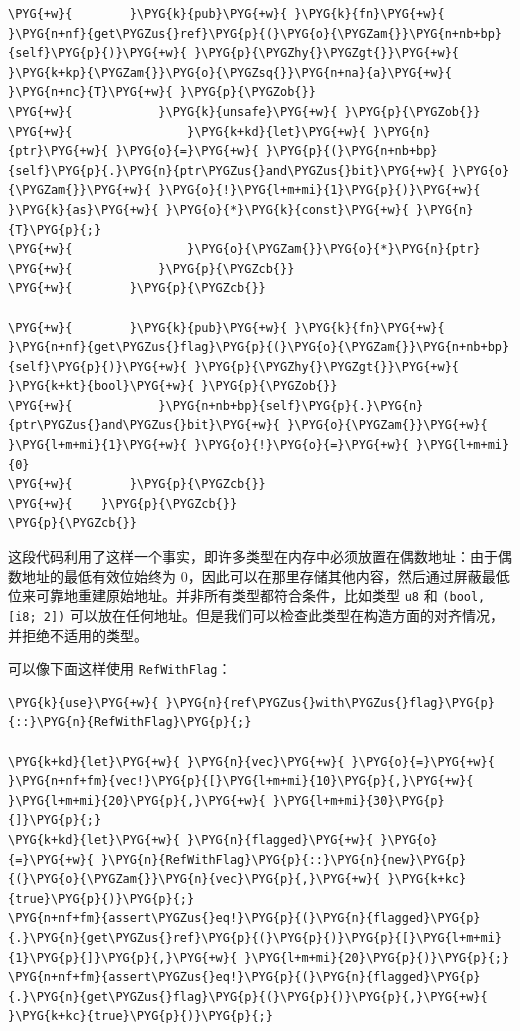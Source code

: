 \begin{Verbatim}[commandchars=\\\{\},breaklines=true,breakanywhere=true,fontsize=\codefont,xleftmargin=17bp]
\PYG{+w}{        }\PYG{k}{pub}\PYG{+w}{ }\PYG{k}{fn}\PYG{+w}{ }\PYG{n+nf}{get\PYGZus{}ref}\PYG{p}{(}\PYG{o}{\PYGZam{}}\PYG{n+nb+bp}{self}\PYG{p}{)}\PYG{+w}{ }\PYG{p}{\PYGZhy{}\PYGZgt{}}\PYG{+w}{ }\PYG{k+kp}{\PYGZam{}}\PYG{o}{\PYGZsq{}}\PYG{n+na}{a}\PYG{+w}{ }\PYG{n+nc}{T}\PYG{+w}{ }\PYG{p}{\PYGZob{}}
\PYG{+w}{            }\PYG{k}{unsafe}\PYG{+w}{ }\PYG{p}{\PYGZob{}}
\PYG{+w}{                }\PYG{k+kd}{let}\PYG{+w}{ }\PYG{n}{ptr}\PYG{+w}{ }\PYG{o}{=}\PYG{+w}{ }\PYG{p}{(}\PYG{n+nb+bp}{self}\PYG{p}{.}\PYG{n}{ptr\PYGZus{}and\PYGZus{}bit}\PYG{+w}{ }\PYG{o}{\PYGZam{}}\PYG{+w}{ }\PYG{o}{!}\PYG{l+m+mi}{1}\PYG{p}{)}\PYG{+w}{ }\PYG{k}{as}\PYG{+w}{ }\PYG{o}{*}\PYG{k}{const}\PYG{+w}{ }\PYG{n}{T}\PYG{p}{;}
\PYG{+w}{                }\PYG{o}{\PYGZam{}}\PYG{o}{*}\PYG{n}{ptr}
\PYG{+w}{            }\PYG{p}{\PYGZcb{}}
\PYG{+w}{        }\PYG{p}{\PYGZcb{}}

\PYG{+w}{        }\PYG{k}{pub}\PYG{+w}{ }\PYG{k}{fn}\PYG{+w}{ }\PYG{n+nf}{get\PYGZus{}flag}\PYG{p}{(}\PYG{o}{\PYGZam{}}\PYG{n+nb+bp}{self}\PYG{p}{)}\PYG{+w}{ }\PYG{p}{\PYGZhy{}\PYGZgt{}}\PYG{+w}{ }\PYG{k+kt}{bool}\PYG{+w}{ }\PYG{p}{\PYGZob{}}
\PYG{+w}{            }\PYG{n+nb+bp}{self}\PYG{p}{.}\PYG{n}{ptr\PYGZus{}and\PYGZus{}bit}\PYG{+w}{ }\PYG{o}{\PYGZam{}}\PYG{+w}{ }\PYG{l+m+mi}{1}\PYG{+w}{ }\PYG{o}{!}\PYG{o}{=}\PYG{+w}{ }\PYG{l+m+mi}{0}
\PYG{+w}{        }\PYG{p}{\PYGZcb{}}
\PYG{+w}{    }\PYG{p}{\PYGZcb{}}
\PYG{p}{\PYGZcb{}}
\end{Verbatim}

这段代码利用了这样一个事实，即许多类型在内存中必须放置在偶数地址：由于偶数地址的最低有效位始终为 0，因此可以在那里存储其他内容，然后通过屏蔽最低位来可靠地重建原始地址。并非所有类型都符合条件，比如类型 \texttt{u8} 和 \texttt{(bool, [i8; 2])} 可以放在任何地址。但是我们可以检查此类型在构造方面的对齐情况，并拒绝不适用的类型。

可以像下面这样使用 \texttt{RefWithFlag}：

\begin{Verbatim}[commandchars=\\\{\},breaklines=true,breakanywhere=true,fontsize=\codefont,xleftmargin=17bp]
\PYG{k}{use}\PYG{+w}{ }\PYG{n}{ref\PYGZus{}with\PYGZus{}flag}\PYG{p}{::}\PYG{n}{RefWithFlag}\PYG{p}{;}

\PYG{k+kd}{let}\PYG{+w}{ }\PYG{n}{vec}\PYG{+w}{ }\PYG{o}{=}\PYG{+w}{ }\PYG{n+nf+fm}{vec!}\PYG{p}{[}\PYG{l+m+mi}{10}\PYG{p}{,}\PYG{+w}{ }\PYG{l+m+mi}{20}\PYG{p}{,}\PYG{+w}{ }\PYG{l+m+mi}{30}\PYG{p}{]}\PYG{p}{;}
\PYG{k+kd}{let}\PYG{+w}{ }\PYG{n}{flagged}\PYG{+w}{ }\PYG{o}{=}\PYG{+w}{ }\PYG{n}{RefWithFlag}\PYG{p}{::}\PYG{n}{new}\PYG{p}{(}\PYG{o}{\PYGZam{}}\PYG{n}{vec}\PYG{p}{,}\PYG{+w}{ }\PYG{k+kc}{true}\PYG{p}{)}\PYG{p}{;}
\PYG{n+nf+fm}{assert\PYGZus{}eq!}\PYG{p}{(}\PYG{n}{flagged}\PYG{p}{.}\PYG{n}{get\PYGZus{}ref}\PYG{p}{(}\PYG{p}{)}\PYG{p}{[}\PYG{l+m+mi}{1}\PYG{p}{]}\PYG{p}{,}\PYG{+w}{ }\PYG{l+m+mi}{20}\PYG{p}{)}\PYG{p}{;}
\PYG{n+nf+fm}{assert\PYGZus{}eq!}\PYG{p}{(}\PYG{n}{flagged}\PYG{p}{.}\PYG{n}{get\PYGZus{}flag}\PYG{p}{(}\PYG{p}{)}\PYG{p}{,}\PYG{+w}{ }\PYG{k+kc}{true}\PYG{p}{)}\PYG{p}{;}
\end{Verbatim}

